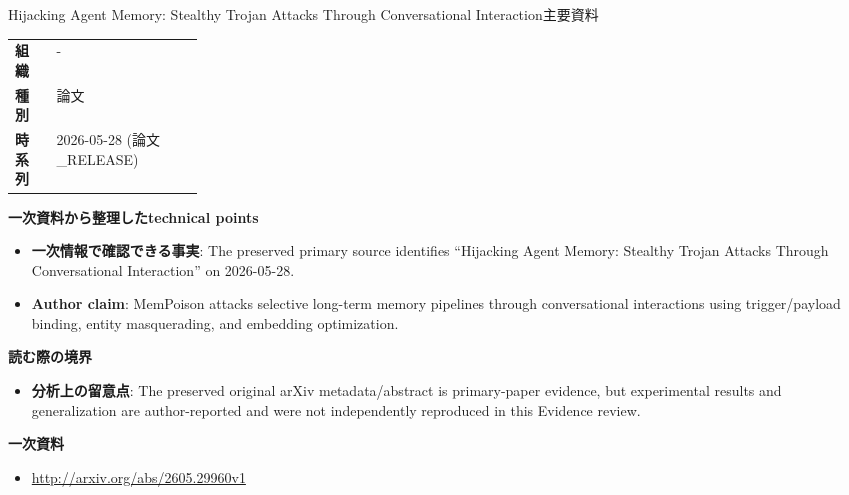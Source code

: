 \begin{technicalnote}{Hijacking Agent Memory: Stealthy Trojan Attacks Through Conversational Interaction}{主要資料}
\begin{tabularx}{\linewidth}{@{}>{\bfseries}p{0.22\linewidth}X@{}}
組織 & - \\
種別 & 論文 \\
時系列 & 2026-05-28 (論文\_RELEASE) \\
\end{tabularx}
\smallskip
{\bfseries 一次資料から整理したtechnical points}
\begin{itemize}[leftmargin=1.5em,itemsep=0.35em]
\item \textbf{一次情報で確認できる事実}: The preserved primary source identifies “Hijacking Agent Memory: Stealthy Trojan Attacks Through Conversational Interaction” on 2026-05-28.
\item \textbf{Author claim}: MemPoison attacks selective long-term memory pipelines through conversational interactions using trigger/payload binding, entity masquerading, and embedding optimization.
\end{itemize}
{\bfseries 読む際の境界}
\begin{itemize}[leftmargin=1.5em,itemsep=0.35em]
\item \textbf{分析上の留意点}: The preserved original arXiv metadata/abstract is primary-paper evidence, but experimental results and generalization are author-reported and were not independently reproduced in this Evidence review.
\end{itemize}
{\bfseries 一次資料}
\begingroup\sloppy
\begin{itemize}[leftmargin=1.5em,itemsep=0.25em]
\item {\scriptsize\url{http://arxiv.org/abs/2605.29960v1}}
\end{itemize}
\endgroup
\end{technicalnote}
\medskip

